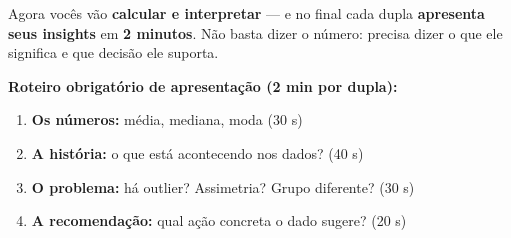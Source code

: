 Agora vocês vão \textbf{calcular e interpretar} — e no final cada dupla
\textbf{apresenta seus insights} em \textbf{2 minutos}. Não basta dizer o
número: precisa dizer o que ele significa e que decisão ele suporta.

\begin{SolvedBox}
\textbf{Roteiro obrigatório de apresentação (2 min por dupla):}
\begin{enumerate}
  \item \textbf{Os números:} média, mediana, moda (30 s)
  \item \textbf{A história:} o que está acontecendo nos dados? (40 s)
  \item \textbf{O problema:} há outlier? Assimetria? Grupo diferente? (30 s)
  \item \textbf{A recomendação:} qual ação concreta o dado sugere? (20 s)
\end{enumerate}
\end{SolvedBox}


